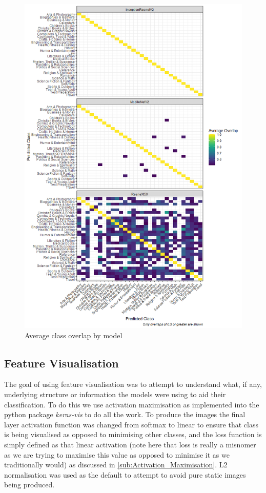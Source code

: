 \documentclass[12pt]{article}
\numberwithin{equation}{section}
\numberwithin{figure}{section}
\begin{document}
\begin{figure}
	\centering
	\captionsetup{justification=centering}
	\includegraphics[scale=0.6]{class_pred_overlap.png}
	\caption{Average class overlap by model}
	\label{fig:class_overlap}
\end{figure}
\subsection{Feature Visualisation} 
\label{sub:Feature_Visualisation} 
The goal of using feature visualisation was to attempt to understand what, if any, underlying structure or information the models were using to aid their classification. To do this we use activation maximisation as implemented into the python package \emph{keras-vis}\cite{keras-vis} to do all the work. To produce the images the final layer activation function was changed from softmax to linear to ensure that class is being visualised as opposed to minimising other classes, and the loss function is simply defined as that linear activation (note here that loss is really a misnomer as we are trying to maximise this value as opposed to minimise it as we traditionally would) as discussed in \cref{sub:Activation_Maximisation}. L2 normalisation was used as the default to attempt to avoid pure static images being produced.
\end{document}
